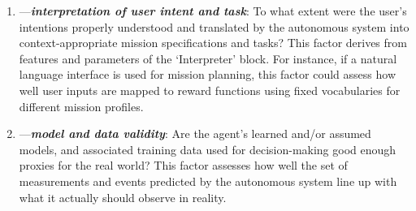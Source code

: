     
\begin{enumerate}
\item \xI---\textit{\textbf{interpretation of user intent and task}}: To what extent were the user's intentions properly understood and translated by the autonomous system into context-appropriate mission specifications and tasks? This factor derives from features and parameters of the `Interpreter' block. For instance, if a natural language interface is used for mission planning, this factor could assess how well user inputs are mapped to reward functions using fixed vocabularies for different mission profiles. 
%
\item \xM---\textit{\textbf{model and data validity}}: Are the agent's learned and/or assumed models, and associated training data used for decision-making good enough proxies for the real world? This factor assesses how well the set of measurements and events predicted by the autonomous system line up with what it actually should observe in reality. 


\end{enumerate}
